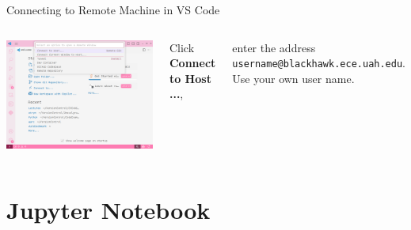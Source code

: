 \documentclass[aspectratio=169,xcolor=dvipsnames,svgnames,x11names,fleqn]{beamer}
\begin{document}
\begin{frame}{Connecting to Remote Machine in VS Code}
\footnotesize
\begin{columns}
\begin{center}
    \includegraphics[width=\textwidth,height=0.75\textheight,keepaspectratio]{figures/VSCode_ConnectTo.png}
\end{center}


    Click \textbf{Connect to Host ...}, 
    
    enter the address \texttt{username@blackhawk.ece.uah.edu}. Use your own user name.


    
\end{columns}
\end{frame}


\section{Jupyter Notebook}

\begin{frame}
    \sectionpage
\end{frame}
\end{document}

